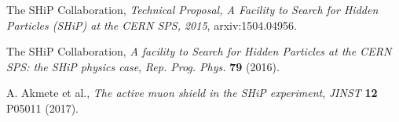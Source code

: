 \documentclass[a4paper,11pt]{article}
\begin{document}

\begin{thebibliography}{99}

The SHiP Collaboration, \emph{Technical Proposal, A Facility to Search for Hidden Particles (SHiP) at the CERN SPS, 2015},
arxiv:1504.04956.

The SHiP Collaboration, \emph{A facility to Search for Hidden Particles at the CERN SPS: the SHiP physics case}, \emph{Rep. Prog. Phys.} {\bf 79} (2016).

A. Akmete et al., \emph{The active muon shield in the SHiP experiment}, \emph{JINST} {\bf 12} P05011 (2017).





\end{thebibliography}
\end{document}
